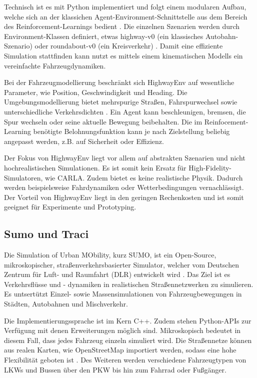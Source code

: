 Technisch ist es mit Python implementiert und folgt einem modularen Aufbau, welche sich an der klassichen Agent-Environment-Schnittstelle aus dem Bereich des Reinforcement-Learnings bedient \cite{highway-env}. Die einzelnen Szenarien werden durch Environment-Klassen definiert, etwas highway-v0 (ein klassisches Autobahn-Szenario) oder roundabout-v0 (ein Kreisverkehr) \cite{highway-env}. Damit eine effiziente Simulation stattfinden kann nutzt es mittels einem kinematischen Modells ein vereinfachte Fahrzeugdynamiken.

Bei der Fahrzeugmodellierung beschränkt sich HighwayEnv auf wesentliche Parameter, wie Position, Geschwindigkeit und Heading. Die Umgebungsmodellierung bietet mehrspurige Straßen, Fahrspurwechsel sowie unterschiedliche Verkehrsdichten \cite{highway-env}. Ein Agent kann beschleunigen, bremsen, die Spur wechseln oder seine aktuelle Bewegung beibehalten. Die im Reinfocement-Learning benötigte Belohnungsfunktion kann je nach Zielstellung beliebig angepasst werden, z.B. auf Sicherheit oder Effizienz. 

Der Fokus von HighwayEnv liegt vor allem auf abstrakten Szenarien und nicht hochrealistischen Simulationen. Es ist somit kein Ersatz für High-Fidelity-Simulatoren, wie CARLA. Zudem bietet es keine realistische Physik. Dadurch werden beispielsweise Fahrdynamiken oder Wetterbedingungen vernachlässigt. Der Vorteil von HighwayEnv liegt in den geringen Rechenkosten und ist somit geeignet für Experimente und Prototyping.
\subsection{Sumo und Traci}
Die Simulation of Urban MObility, kurz SUMO, ist ein Open-Source, mikroskopischer, straßenverkehrsbasierter Simulator, welcher vom Deutschen Zentrum für Luft- und Raumfahrt (DLR) entwickelt wird \cite{SUMO2018}. Das Ziel ist es Verkehrsflüsse und - dynamiken in realistischen Straßennetzwerken zu simulieren. Es untsertützt Einzel- sowie Massensimulationen von Fahrzeugbewegungen in Städten, Autobahnen und Mischverkehr.

Die Implementierungssprache ist im Kern C++. Zudem stehen Python-APIs zur Verfügung mit denen Erweiterungen möglich sind. Mikroskopisch bedeutet in diesem Fall, dass jedes Fahrzeug einzeln simuliert wird. Die Straßennetze können aus realen Karten, wie OpenStreetMap importiert werden, sodass eine hohe Flexibilität geboten ist \cite{sumo_open_street_map}. Des Weiteren werden verschiedene Fahrzeugtypen von LKWs und Bussen über den PKW bis hin zum Fahrrad oder Fußgänger.

